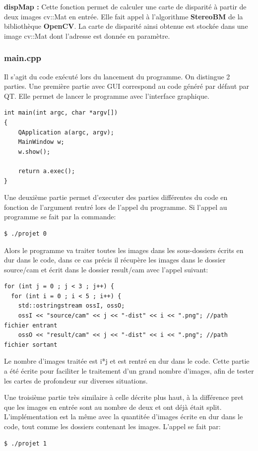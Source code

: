 \documentclass[a4paper]{article}
\begin{document}
\textbf{dispMap :} Cette fonction permet de calculer une carte de disparité à
partir de deux images cv::Mat en entrée. Elle fait appel à l'algorithme
\textbf{StereoBM} de la bibliothèque \textbf{OpenCV}. La carte de disparité ainsi
obtenue est stockée dans une image cv::Mat dont l'adresse est donnée en paramètre.

\newpage
\subsubsection*{main.cpp}

Il s'agit du code exécuté lors du lancement du programme. On distingue 2 parties.
Une première partie avec GUI correspond au code généré par défaut par QT.
Elle permet de lancer le programme avec l'interface graphique.

\begin{verbatim}
int main(int argc, char *argv[])
{
	QApplication a(argc, argv);
	MainWindow w;
	w.show();

	return a.exec();
}
\end{verbatim}

Une deuxième partie permet d'executer des parties différentes du code en fonction de l'argument rentré lors de l'appel du programme. Si l'appel au programme se fait par la commande:
\begin{verbatim}
$ ./projet 0
\end{verbatim}
Alors le programme va traiter toutes les images dans les sous-dossiers écrits en dur dans le code, dans ce cas précis il récupère les images dans le dossier source/cam et écrit dans le dossier result/cam avec l'appel suivant:
\begin{verbatim}
for (int j = 0 ; j < 3 ; j++) {
  for (int i = 0 ; i < 5 ; i++) {
    std::ostringstream ossI, ossO;
    ossI << "source/cam" << j << "-dist" << i << ".png"; //path fichier entrant
    ossO << "result/cam" << j << "-dist" << i << ".png"; //path fichier sortant
\end{verbatim}
Le nombre d'images traitée est i*j et est rentré en dur dans le code. Cette partie a été écrite pour faciliter le traitement d'un grand nombre d'images, afin de tester les cartes de profondeur sur diverses situations.

Une troisième partie très similaire à celle décrite plus haut, à la différence pret que les images en entrée sont au nombre de deux et ont déjà était split. L'implémentation est la même avec la quantitée d'images écrite en dur dans le code, tout comme les dossiers contenant les images. L'appel se fait par:
\begin{verbatim}
$ ./projet 1
\end{verbatim}
\end{document}

